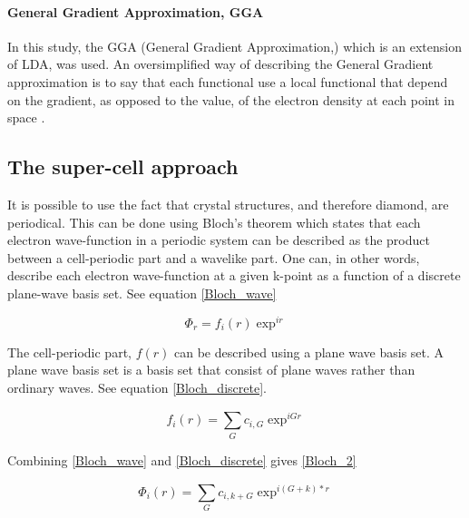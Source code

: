 \documentclass[10pt,a4paper]{article}
\begin{document}
\paragraph{General Gradient Approximation, GGA}
In this study, the GGA (General Gradient Approximation,) which is an extension of LDA, was used. An oversimplified way of describing the General Gradient approximation is to say that each functional use a local functional that depend on the gradient, as opposed to the value, of the electron density at each point in space \cite{burke}.


\subsection{The super-cell approach}
It is  possible to use the fact that crystal structures, and therefore diamond, are periodical. This can be done using Bloch's theorem which states that each electron wave-function in a periodic system can be described as the product between a cell-periodic part and a wavelike part. One can, in other words, describe each electron wave-function at a given k-point as a function of a discrete plane-wave basis set. See equation \ref{Bloch_wave}

\begin{equation}\label{Bloch_wave} \tag{Bloch's theorem 1} 
\Phi_r=f_i(r)\exp^{ir}
\end{equation}

The cell-periodic part, $f(r)$ can be described using a plane wave basis set. A plane wave basis set is a basis set that consist of plane waves rather than ordinary waves. See equation \ref{Bloch_discrete}.

\begin{equation}\label{Bloch_discrete} \tag{Bloch's theorem (discrete part 1)} 
f_i(r)=\sum\limits_{G}^{} c_{i, G}\exp^{iGr}
\end{equation}

Combining \ref{Bloch_wave} and \ref{Bloch_discrete} gives \ref{Bloch_2}

\begin{equation}\label{Bloch_2} \tag{Bloch's theorem 2} 
\Phi_i(r)=\sum\limits_{G}^{} c_{i,k + G} \exp^{i(G+k)*r}
\end{equation}
\end{document}
